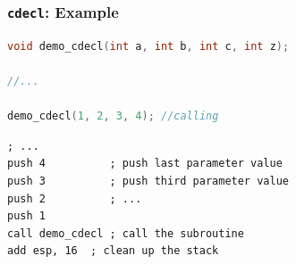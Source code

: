 \documentclass[]{beamer}
\begin{document}
\begin{frame}[fragile]
  \frametitle{{\tt cdecl}: Example}
\begin{lstlisting}[language=C]
void demo_cdecl(int a, int b, int c, int z);

//...

demo_cdecl(1, 2, 3, 4); //calling
\end{lstlisting}

\begin{lstlisting}[language={[x86masm]Assembler}]
; ...
push 4          ; push last parameter value
push 3          ; push third parameter value
push 2          ; ...
push 1
call demo_cdecl ; call the subroutine
add esp, 16  ; clean up the stack
\end{lstlisting}

\end{frame}




\end{document}
